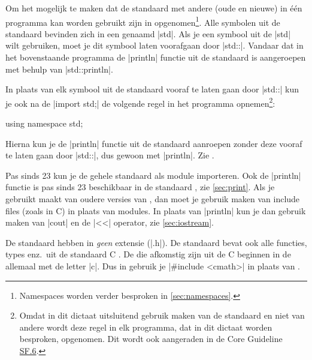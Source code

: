 \begin{cpplstShortInline}
Om het mogelijk te maken dat de standaard  met andere (oude en nieuwe)  in één programma kan worden gebruikt zijn in \Cpp{}  \label{namespace} opgenomen\footnote{%
	Namespaces worden verder besproken in \cref{sec:namespaces}. 
}. 
Alle symbolen uit de \Cpp{} standaard  bevinden zich in een  genaamd |std|.
Als je een symbool uit de  |std| wilt gebruiken, moet je dit symbool laten voorafgaan door |std::|.
Vandaar dat in het bovenstaande programma de |println| functie uit de standaard  is aangeroepen met behulp van |std::println|.

In plaats van elk symbool uit de \Cpp{} standaard  vooraf te laten gaan door |std::| kun je ook na de |import std;| de volgende regel in het programma opnemen\footnote{%
	Omdat in dit dictaat uitsluitend gebruik maken van de standaard  en niet van andere  wordt deze regel in elk programma, dat in dit dictaat worden besproken, opgenomen.
	Dit wordt ook aangeraden in de \Cpp{} Core Guideline \href{https://isocpp.github.io/CppCoreGuidelines/CppCoreGuidelines\#sf6-use-using-namespace-directives-for-transition-for-foundation-libraries-such-as-std-or-within-a-local-scope-only}{SF.6}. 
}:
\begin{cpplstfragment}
using namespace std;
\end{cpplstfragment}
Hierna kun je de |println| functie uit de standaard  aanroepen zonder deze vooraf te laten gaan door |std::|, dus gewoon met |println|.
Zie .

Pas sinds \Cpp{}23 kun je de gehele standaard  als module importeren.
Ook de |println| functie is pas sinds \Cpp{}23 beschikbaar in de standaard , zie \cref{sec:print}.
Als je gebruikt maakt van oudere versies van \Cpp{}, dan moet je gebruik maken van include files (zoals in C) in plaats van modules.
In plaats van |println| kun je dan gebruik maken van |cout| en de |<<| operator, zie \cref{sec:iostream}.

De standaard  hebben in \Cpp{} \emph{geen} extensie (|.h|).
De standaard \Cpp{}  bevat ook alle functies, types enz.\ uit de standaard C .
De  die afkomstig zijn uit de C  beginnen in de \Cpp{}  allemaal met de letter |c|.
Dus in \Cpp{} gebruik je |#include <cmath>| in plaats van .


\end{cpplstShortInline}

